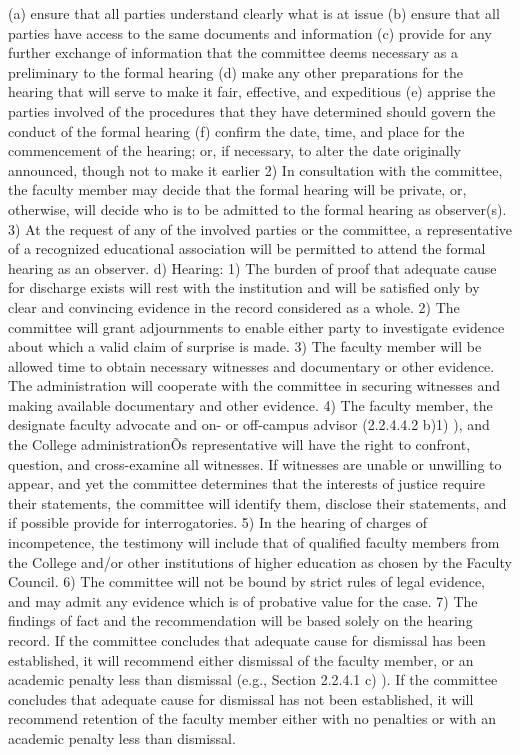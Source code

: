 \documentclass[letterpaper, 11pt]{article}
\begin{document}
	(a) ensure that all parties understand clearly what is at issue
	(b) ensure that all parties have access to the same documents and information
	(c) provide for any further exchange of information that the committee deems necessary as a preliminary to the formal hearing
	(d) make any other preparations for the hearing that will serve to make it fair, effective, and expeditious
	(e) apprise the parties involved of the procedures that they have determined should govern the conduct of the formal hearing
	(f) confirm the date, time, and place for the commencement of the hearing; or, if necessary, to alter the date originally announced, though not to make it earlier
	2) In consultation with the committee, the faculty member may decide that the formal hearing will be private, or, otherwise, will decide who is to be admitted to the formal hearing as observer(s).
	3) At the request of any of the involved parties or the committee, a representative of a recognized educational association will be permitted to attend the formal hearing as an observer.
	d) Hearing:
	1) The burden of proof that adequate cause for discharge exists will rest with the institution and will be satisfied only by clear and convincing evidence in the record considered as a whole.
	2) The committee will grant adjournments to enable either party to investigate evidence about which a valid claim of surprise is made.
	3) The faculty member will be allowed time to obtain necessary witnesses and documentary or other evidence.  The administration will cooperate with the committee in securing witnesses and making available documentary and other evidence.
	4) The faculty member, the designate faculty advocate and on- or off-campus advisor (2.2.4.4.2  b)1) ), and the College administrationÕs representative will have the right to confront, question, and cross-examine all witnesses.  If witnesses are unable or unwilling to appear, and yet the committee determines that the interests of justice require their statements, the committee will identify them, disclose their statements, and if possible provide for interrogatories.
	5) In the hearing of charges of incompetence, the testimony will include that of qualified faculty members from the College and/or other institutions of higher education as chosen by the Faculty Council.
	6) The committee will not be bound by strict rules of legal evidence, and may admit any evidence which is of probative value for the case.
	7) The findings of fact and the recommendation will be based solely on the hearing record.
	If the committee concludes that adequate cause for dismissal has been established, it will recommend either dismissal of the faculty member, or an academic penalty less than dismissal (e.g., Section 2.2.4.1 c) ).  If the committee concludes that adequate cause for dismissal has not been established, it will recommend retention of the faculty member either with no penalties or with an academic penalty less than dismissal.
\end{document}
